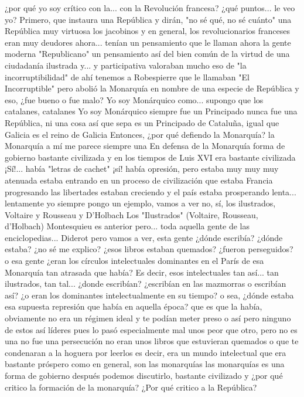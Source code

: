 ¿por qué yo soy crítico con la... con la Revolución francesa? ¿qué puntos...
le veo yo? Primero, que instaura una República
y dirán, "no sé qué, no sé cuánto" una República muy virtuosa los jacobinos y en general, los revolucionarios franceses
eran muy deudores ahora... tenían un pensamiento que le llaman ahora la gente moderna "Republicano" un pensamiento así
del bien común de la virtud de una ciudadanía
ilustrada y... y participativa valoraban mucho eso de "la incorruptibilidad"
de ahí tenemos a Robespierre que le llamaban "El Incorruptible" pero abolió la Monarquía en nombre de una especie de República
y eso, ¿fue bueno o fue malo? Yo soy Monárquico como... supongo que los catalanes, catalanes
Yo soy Monárquico
siempre fue un Principado nunca fue una República, ni una cosa así que sepa es un Principado de Cataluña, igual que Galicia
es el reino de Galicia Entonces, ¿por qué defiendo la Monarquía? la Monarquía a mí me parece siempre una
En defensa de la Monarquía
forma de gobierno bastante civilizada y en los tiempos de Luis XVI era bastante civilizada
¡Sí!... había "letras de cachet" ¡sí! había opresión, pero estaba muy muy muy atenuada
estaba entrando en un proceso de civilización que estaba Francia progresando las libertades estaban creciendo
y el país estaba prosperando lenta... lentamente yo siempre pongo un ejemplo, vamos a ver no, sí, los ilustrados, Voltaire y Rousseau y D'Holbach
Los "Ilustrados" (Voltaire, Rousseau, d'Holbach)
Montesquieu es anterior pero... toda aquella gente de las enciclopedias... Diderot pero vamos a ver, esta gente ¿dónde escribía?
¿dónde estaba? ¿no sé me explico? ¿esos libros estaban quemados? ¿fueron perseguidos? o esa gente ¿eran los círculos intelectuales dominantes en el París
de esa Monarquía tan atrasada que había? Es decir, esos intelectuales tan así...
tan ilustrados, tan tal... ¿donde escribían? ¿escribían en las mazmorras o escribían así?
¿o eran los dominantes intelectualmente en su tiempo? o sea, ¿dónde estaba
esa supuesta represión que había en aquella época? que es que la había, obviamente no era un régimen ideal y te podían meter preso o así
pero ninguno de estos así líderes pues lo pasó especialmente mal unos peor que otro, pero no es una
no fue una persecución no eran unos libros que estuvieran quemados o que te condenaran a la hoguera por leerlos es decir, era un mundo intelectual que era bastante próspero
como en general, son las monarquías las monarquías es una forma de gobierno después podemos discutirlo, bastante civilizado y ¿por qué critico la formación de la monarquía?
¿Por qué critico a la República?
